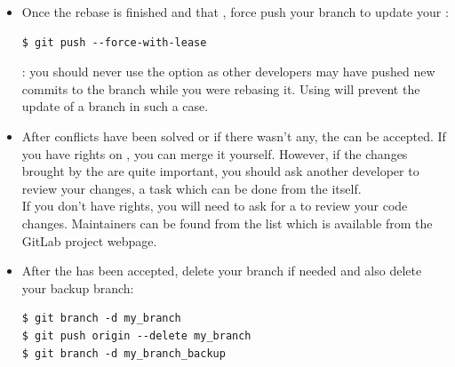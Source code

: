\begin{itemize}
\item Once the rebase is finished and that , force push your branch to update your
:
\begin{lstlisting}
$ git push --force-with-lease
\end{lstlisting}

: you should never use the  option
as other developers may have pushed new commits to the branch while you were
rebasing it. Using  will prevent the update of
a branch in such a case.

\item After conflicts have been solved or if there wasn't any, the
 can be accepted. If you have  rights on
, you can merge it yourself. However, if the changes brought by
the  are quite important, you should ask another developer to
review your changes, a task which can be done from the  itself.\\

If you don't have  rights, you will need to ask for a
 to review your code changes. Maintainers can be found
from the  list which is available from the GitLab
project webpage.\\

\item After the  has been accepted, delete your branch if needed
and also delete your backup branch:
\begin{lstlisting}
$ git branch -d my_branch
$ git push origin --delete my_branch
$ git branch -d my_branch_backup
\end{lstlisting}
\end{itemize}